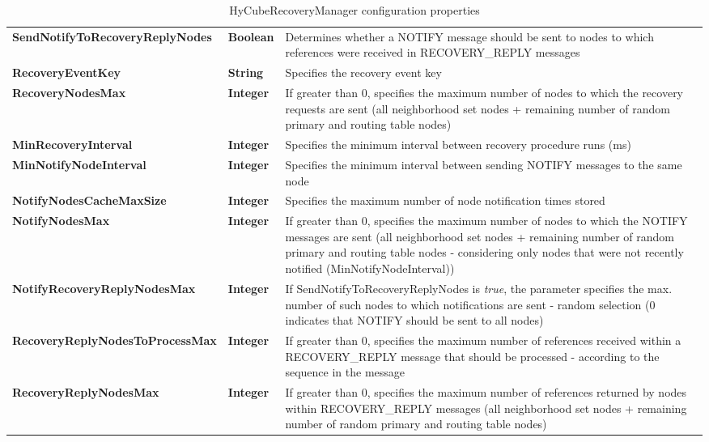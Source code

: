 \begin{table}
\begin{center}
\begin{tabular}{p{5cm} p{1.5cm} p{8.0cm}}
	\textbf{SendNotifyToRecoveryReplyNodes}				& \textbf{Boolean}				& Determines whether a NOTIFY message should be sent to nodes to which references were received in RECOVERY\_REPLY messages							\\[1.5mm]	
	\textbf{RecoveryEventKey}							& \textbf{String}				& Specifies the recovery event key							\\[1.5mm]	
	\textbf{RecoveryNodesMax}							& \textbf{Integer}				& If greater than 0, specifies the maximum number of nodes to which the recovery requests are sent (all neighborhood set nodes + remaining number of random primary and routing table nodes)						\\[1.5mm]	
	\textbf{MinRecoveryInterval}						& \textbf{Integer}				& Specifies the minimum interval between recovery procedure runs (ms)							\\[1.5mm]	
	\textbf{MinNotifyNodeInterval}						& \textbf{Integer}				& Specifies the minimum interval between sending NOTIFY messages to the same node						\\[1.5mm]	
	\textbf{NotifyNodesCacheMaxSize}					& \textbf{Integer}				& Specifies the maximum number of node notification times stored										\\[1.5mm]	
	\textbf{NotifyNodesMax}								& \textbf{Integer}				& If greater than 0, specifies the maximum number of nodes to which the NOTIFY messages are sent (all neighborhood set nodes + remaining number of random primary and routing table nodes - considering only nodes that were not recently notified (MinNotifyNodeInterval))							\\[1.5mm]	
	\textbf{NotifyRecoveryReplyNodesMax}				& \textbf{Integer}				& If SendNotifyToRecoveryReplyNodes is \emph{true}, the parameter specifies the max. number of such nodes to which notifications are sent - random selection (0 indicates that NOTIFY should be sent to all nodes)					\\[1.5mm]	
	\textbf{RecoveryReplyNodesToProcessMax}				& \textbf{Integer}				& If greater than 0, specifies the maximum number of references received within a RECOVERY\_REPLY message that should be processed - according to the sequence in the message											\\[1.5mm]	
	\textbf{RecoveryReplyNodesMax}						& \textbf{Integer}				& If greater than 0, specifies the maximum number of references returned by nodes within RECOVERY\_REPLY messages (all neighborhood set nodes + remaining number of random primary and routing table nodes)						\\[1.5mm]	
    \hline
\end{tabular}
\end{center}
\caption{HyCubeRecoveryManager configuration properties}
\label{tab:libHyCubeRecoveryManager}
\end{table}

